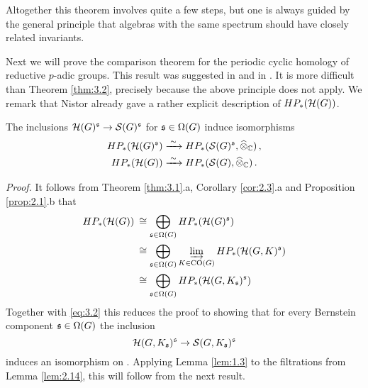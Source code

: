 Altogether this theorem involves quite a few steps, but one is always
guided by the general principle that algebras with the same spectrum should 
have closely related invariants. 

Next we will prove the comparison theorem for the periodic cyclic homology
of reductive $p$-adic groups. This result was suggested in 
\cite[Conjecture 8.9]{BHP2} and in \cite[Section 4]{ABP}. It is more difficult than 
Theorem \ref{thm:3.2}, precisely because the above principle does not apply.
We remark that Nistor \cite[Theorem 4.2]{Nis} already gave a rather explicit 
description of $HP_* (\mathcal H (G))$.

\begin{thm}\label{thm:3.3}
The inclusions $\mathcal H (G)^{\mathfrak s} \to \mathcal S (G)^{\mathfrak s}$ for $\mathfrak s \in \Omega (G)$
induce isomorphisms
\begin{align*}
HP_* ( \mathcal H (G)^{\mathfrak s} ) &\xrightarrow{\;\sim\;} HP_* ( \mathcal S (G)^{\mathfrak s}, \widehat{\otimes}_{\mathbb C} ) \,, \\
HP_* ( \mathcal H (G) ) &\xrightarrow{\;\sim\;} HP_* ( \mathcal S (G),\widehat{\otimes}_{\mathbb C} ) \,.
\end{align*}
\end{thm}
\emph{Proof.}
It follows from Theorem \ref{thm:3.1}.a, Corollary \ref{cor:2.3}.a and Proposition 
\ref{prop:2.1}.b that 
\begin{equation}\label{eq:3.4}
\begin{aligned}
HP_* (\mathcal H (G) ) \: &\cong 
\bigoplus_{\mathfrak s \in \Omega (G)} 
HP_* (\mathcal H (G)^{\mathfrak s} )\\
&\cong \bigoplus_{\mathfrak s \in \Omega (G)} \varinjlim_{K \in \mathrm{CO}(G)}
HP_* (\mathcal H (G,K)^{\mathfrak s} )\\
&\cong \bigoplus_{\mathfrak s \in \Omega (G)} 
HP_* (\mathcal H (G, K_{\mathfrak s})^{\mathfrak s} )\\
\end{aligned}
\end{equation}
Together with \eqref{eq:3.2} this reduces the proof to showing that for every
Bernstein component $\mathfrak s \in \Omega (G)$ the inclusion
\begin{equation}
\mathcal H (G,K_{\mathfrak s} )^{\mathfrak s} \to \mathcal S (G,K_{\mathfrak s} )^{\mathfrak s} 
\end{equation}
induces an isomorphism on \pch \!. Applying Lemma \ref{lem:1.3} to the filtrations
from Lemma \ref{lem:2.14}, this will follow from the next result.

